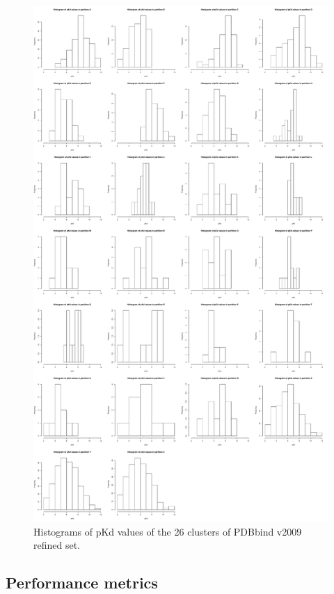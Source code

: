 \begin{figure}
\includegraphics[width=\linewidth]{../rfcyscore/lcocv.pdf}
\caption{Histograms of pKd values of the 26 clusters of PDBbind v2009 refined set.}
\label{rfcyscore:lcocv}
\end{figure}

\subsection{Performance metrics}

